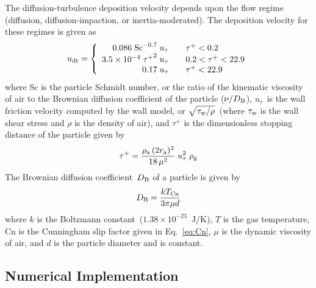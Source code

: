 The diffusion-turbulence deposition velocity depends upon the flow regime (diffusion, diffusion-impaction, or inertia-moderated). The deposition velocity for these regimes is given as~\cite{McCoy_Hanratty}
\begin{equation}
u\sb{dt} = \left\{ \begin{array}{r@{\quad \quad}l}
         0.086 \; \textrm{Sc}^{-0.7} \; u_{\tau}        &  \tau^+ < 0.2 \\
         3.5 \times 10^{-4} \; {\tau^+}^2 \; u_{\tau} &  0.2 < \tau^+ < 22.9 \\
         0.17 \; u_{\tau}                             &  \tau^+ < 22.9
         \end{array} \right.
\end{equation}
where Sc is the particle Schmidt number, or the ratio of the kinematic viscosity of air to the Brownian diffusion coefficient of the particle ($\nu/D\sb{B}$), $u_{\tau}$~is the wall friction velocity computed by the wall model, or $\sqrt{\tau\sb{w}/\rho}$~(where $\tau\sb{w}$ is the wall shear stress and $\rho$ is the density of air), and $\tau^+$ is the dimensionless stopping distance of the particle given by~\cite{Ludwig_ICONE}
\begin{equation}
 \tau^+=\frac{\rho\sb{a} \, (2 r\sb{a})^2}{18 \, \mu^2}  \; u_{\tau}^2 \; \rho\sb{g}
\end{equation}
The Brownian diffusion coefficient~$D\sb{B}$ of a particle is given by
\begin{equation}
D\sb{B} = \frac{k T \sb{Cn}}{3 \pi \mu d}
\end{equation}
where $k$ is the Boltzmann constant~($1.38 \times 10^{-23}$~J/K), $T$ is the gas temperature, Cn is the Cunningham slip factor given in Eq.~\ref{eq:Cn}, $\mu$ is the dynamic viscosity of air, and $d$ is the particle diameter and is constant.

\subsection{Numerical Implementation}

